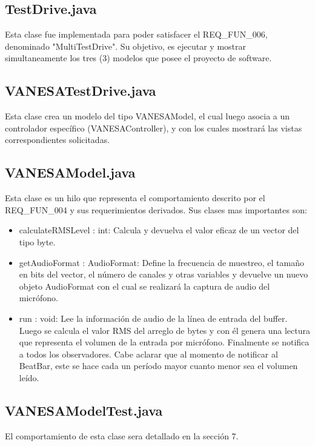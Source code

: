 \documentclass[10pt]{article} %
\begin{document}
\subsection{TestDrive.java}
Esta clase fue implementada para poder satisfacer el REQ\_FUN\_006, denominado "MultiTestDrive". Su objetivo, es ejecutar y mostrar simultaneamente los tres (3) modelos que posee el proyecto de software.

\subsection{VANESATestDrive.java}
Esta clase crea un modelo del tipo VANESAModel, el cual luego asocia a un controlador específico (VANESAController), y con los cuales mostrará las vistas correspondientes solicitadas.

\subsection{VANESAModel.java}
Esta clase es un hilo que representa el comportamiento descrito por el REQ\_FUN\_004 y sus requerimientos derivados. Sus clases mas importantes son:
\begin{itemize}
\item calculateRMSLevel : int: Calcula y devuelva el valor eficaz de un vector del tipo byte. 
\item getAudioFormat : AudioFormat: Define la frecuencia de muestreo, el tamaño en bits del vector, el número de canales y otras variables y devuelve un nuevo objeto AudioFormat con el cual se realizará la captura de audio del micrófono.
\item run : void: Lee la información de audio de la línea de entrada del buffer. Luego se calcula el valor RMS del arreglo de bytes y con él genera una lectura que representa el volumen de la entrada por micrófono. Finalmente se notifica a todos los observadores. Cabe aclarar que al momento de notificar al BeatBar, este se hace cada un período mayor cuanto menor sea el volumen leído.
\end{itemize}

\subsection{VANESAModelTest.java}
El comportamiento de esta clase sera detallado en la sección 7. %
\end{document}
